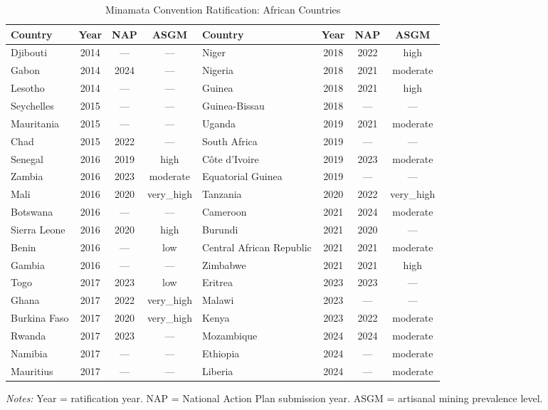 \begin{table}[htbp]
\centering
\caption{Minamata Convention Ratification: African Countries}
\label{tab:ratification}
\footnotesize
\begin{tabular}{lccc|lccc}
\hline\hline
Country & Year & NAP & ASGM & Country & Year & NAP & ASGM \\
\hline
Djibouti & 2014 & --- & --- & Niger & 2018 & 2022 & high \\
Gabon & 2014 & 2024 & --- & Nigeria & 2018 & 2021 & moderate \\
Lesotho & 2014 & --- & --- & Guinea & 2018 & 2021 & high \\
Seychelles & 2015 & --- & --- & Guinea-Bissau & 2018 & --- & --- \\
Mauritania & 2015 & --- & --- & Uganda & 2019 & 2021 & moderate \\
Chad & 2015 & 2022 & --- & South Africa & 2019 & --- & --- \\
Senegal & 2016 & 2019 & high & Côte d’Ivoire & 2019 & 2023 & moderate \\
Zambia & 2016 & 2023 & moderate & Equatorial Guinea & 2019 & --- & --- \\
Mali & 2016 & 2020 & very_high & Tanzania & 2020 & 2022 & very_high \\
Botswana & 2016 & --- & --- & Cameroon & 2021 & 2024 & moderate \\
Sierra Leone & 2016 & 2020 & high & Burundi & 2021 & 2020 & --- \\
Benin & 2016 & --- & low & Central African Republic & 2021 & 2021 & moderate \\
Gambia & 2016 & --- & --- & Zimbabwe & 2021 & 2021 & high \\
Togo & 2017 & 2023 & low & Eritrea & 2023 & 2023 & --- \\
Ghana & 2017 & 2022 & very_high & Malawi & 2023 & --- & --- \\
Burkina Faso & 2017 & 2020 & very_high & Kenya & 2023 & 2022 & moderate \\
Rwanda & 2017 & 2023 & --- & Mozambique & 2024 & 2024 & moderate \\
Namibia & 2017 & --- & --- & Ethiopia & 2024 & --- & moderate \\
Mauritius & 2017 & --- & --- & Liberia & 2024 & --- & moderate \\
\hline\hline
\end{tabular}
\begin{tablenotes}[flushleft]\small
\item \textit{Notes:} Year = ratification year. NAP = National Action Plan submission year. ASGM = artisanal mining prevalence level.
\end{tablenotes}
\end{table}
